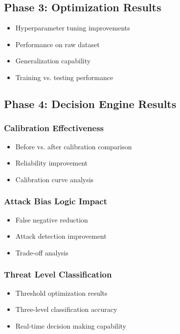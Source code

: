 \documentclass[conference]{IEEEtran}
\begin{document}
\subsection{Phase 3: Optimization Results}
\begin{itemize}
    \item Hyperparameter tuning improvements
    \item Performance on raw dataset
    \item Generalization capability
    \item Training vs. testing performance
\end{itemize}

\subsection{Phase 4: Decision Engine Results}

\subsubsection{Calibration Effectiveness}
\begin{itemize}
    \item Before vs. after calibration comparison
    \item Reliability improvement
    \item Calibration curve analysis
\end{itemize}

\subsubsection{Attack Bias Logic Impact}
\begin{itemize}
    \item False negative reduction
    \item Attack detection improvement
    \item Trade-off analysis
\end{itemize}

\subsubsection{Threat Level Classification}
\begin{itemize}
    \item Threshold optimization results
    \item Three-level classification accuracy
    \item Real-time decision making capability
\end{itemize}
\end{document}
